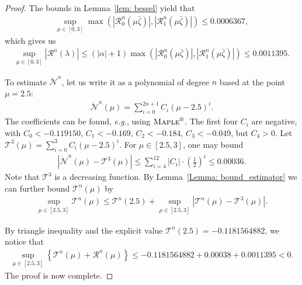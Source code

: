 \documentclass[11pt,a4paper,english,reqno]{amsart}
\theoremstyle{plain}
\newcommand{\1}{\mathbbm{1}}
\begin{document}
\begin{proof}
The bounds in Lemma~\ref{lem: bessel} yield that
\begin{eqnarray*}
\sup_{\mu \in [0, 3]} \max\left(\left|\mathscr{R}_{0}^{n}\left(\mu \bar{\zeta}\right)\right|, \left|\mathscr{R}_{1}^{n}\left(\mu \bar{\zeta}\right)\right|\right) \leq 0.0006367,
\end{eqnarray*}
which gives us
\begin{eqnarray*}
\sup_{\mu \in [0, 3]}\left|\mathscr{R}^{n}(\lambda)\right| \leq (|\alpha| + 1)\max\left(\left|\mathscr{R}_{0}^{n}\left(\mu \bar{\zeta}\right)\right|, \left|\mathscr{R}_{1}^{n}\left(\mu \bar{\zeta}\right)\right|\right) \leq 0.0011395.
\end{eqnarray*}



To estimate $\mathring{\mathcal{N}}^{n}$, let us write it as a polynomial of degree $n$ based at the point $\mu = 2.5$:
\begin{eqnarray*}
\mathring{\mathcal{N}}^{n}(\mu) = \sum_{i = 0}^{2n+1} C_i (\mu - 2.5)^{i}.
\end{eqnarray*}
The coefficients can be found, \emph{e.g.}, using $\textsc{Maple}^\text{\textregistered}$.  The first four $C_i$ are negative, with $C_{0}<-0.119150$, $C_1 < -0.169$, $C_2 < - 0.184$,  $C_3 < -0.049$, but $C_{4} > 0$. Let $\mathscr{T}^{3}(\mu) = \sum_{i=0}^{3}C_i(\mu - 2.5)^i$. For $\mu \in [2.5, 3]$, one may bound
\begin{eqnarray*}
\left|\mathring{\mathcal{N}}^{n}(\mu) - \mathscr{T}^{3}(\mu)\right|\leq \sum_{i = 4}^{12} |C_{i}| \cdot \left(\frac{1}{2}\right)^{i} \leq 0.00036.
\end{eqnarray*}
Note that $\mathscr{T}^{3}$ is a decreasing function. By Lemma~\ref{Lemma: bound_estimator}  we can further bound $\mathscr{T}^{n}(\mu)$ by
\begin{eqnarray*}
\sup_{\mu \in [2.5, 3] }\mathscr{T}^{n}(\mu) \leq \mathscr{T}^{n}(2.5) + \sup_{\mu \in [2.5, 3]} \left|\mathscr{T}^{n}(\mu) - \mathscr{T}^{3}(\mu)\right|.
\end{eqnarray*}





By triangle inequality and the explicit value $\mathscr{T}^{n}(2.5) = -0.1181564882$, we notice that
\begin{eqnarray*}
\sup_{\mu \in [2.5, 3]} \left\{\mathscr{T}^{n}(\mu) + {\mathscr{R}}^{n}(\mu)\right\}\leq -0.1181564882 + 0.00038 + 0.0011395 <0.
\end{eqnarray*}
The proof is now complete.  \end{proof}
\end{document}
